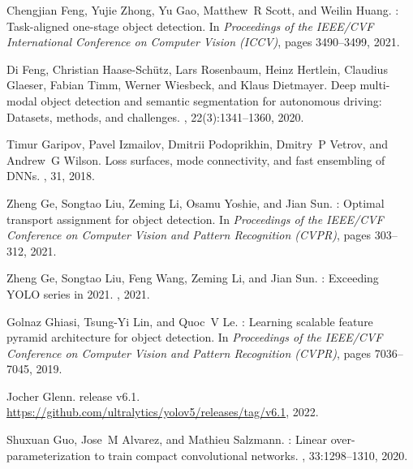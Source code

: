 \documentclass[10pt,twocolumn,letterpaper]{article}
\begin{document}
{\begin{thebibliography}{100}
				Chengjian Feng, Yujie Zhong, Yu Gao, Matthew~R Scott, and Weilin Huang.
				: Task-aligned one-stage object detection.
				\newblock In {\em Proceedings of the IEEE/CVF International Conference on
					Computer Vision (ICCV)}, pages 3490--3499, 2021.
				
				Di Feng, Christian Haase-Sch{\"u}tz, Lars Rosenbaum, Heinz Hertlein, Claudius
				Glaeser, Fabian Timm, Werner Wiesbeck, and Klaus Dietmayer.
				\newblock Deep multi-modal object detection and semantic segmentation for
				autonomous driving: Datasets, methods, and challenges.
				,
				22(3):1341--1360, 2020.
				
				Timur Garipov, Pavel Izmailov, Dmitrii Podoprikhin, Dmitry~P Vetrov, and
				Andrew~G Wilson.
				\newblock Loss surfaces, mode connectivity, and fast ensembling of {DNNs}.
				,
				31, 2018.
				
				Zheng Ge, Songtao Liu, Zeming Li, Osamu Yoshie, and Jian Sun.
				: Optimal transport assignment for object detection.
				\newblock In {\em Proceedings of the IEEE/CVF Conference on Computer Vision and
					Pattern Recognition (CVPR)}, pages 303--312, 2021.
				
				Zheng Ge, Songtao Liu, Feng Wang, Zeming Li, and Jian Sun.
				: Exceeding {YOLO} series in 2021.
				, 2021.
				
				Golnaz Ghiasi, Tsung-Yi Lin, and Quoc~V Le.
				: Learning scalable feature pyramid architecture for object
				detection.
				\newblock In {\em Proceedings of the IEEE/CVF Conference on Computer Vision and
					Pattern Recognition (CVPR)}, pages 7036--7045, 2019.
				
				Jocher Glenn.
				 release v6.1.
				\newblock \url{https://github.com/ultralytics/yolov5/releases/tag/v6.1}, 2022.
				
				Shuxuan Guo, Jose~M Alvarez, and Mathieu Salzmann.
				: Linear over-parameterization to train compact
				convolutional networks.
				,
				33:1298--1310, 2020.
				

\end{thebibliography}}
\end{document}
